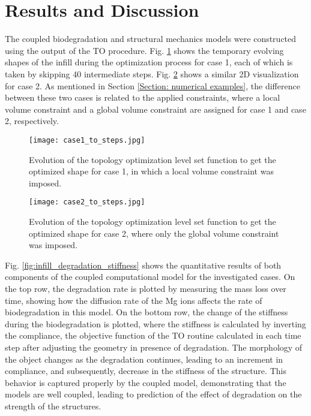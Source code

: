 \section{Results and Discussion}\label{section:infill_results}

The coupled biodegradation and structural mechanics models were constructed using the output of the TO procedure. Fig. \ref{fig:infill_case1_to_steps} shows the temporary evolving shapes of the infill during the optimization process for case 1, each of which is taken by skipping 40 intermediate steps. Fig. \ref{fig:infill_case2_to_steps} shows a similar 2D visualization for case 2. As mentioned in Section \ref{Section: numerical examples}, the difference between these two cases is related to the applied constraints, where a local volume constraint and a global volume constraint are assigned for case 1 and case 2, respectively. 


\begin{figure}[h]
\centering
\medskip
\texttt{[image: case1\_to\_steps.jpg]}
\caption[Evolution of the topology optimization level set function for case 1]{Evolution of the topology optimization level set function to get the optimized shape for case 1, in which a local volume constraint was imposed.} \label{fig:infill_case1_to_steps}
\end{figure}

\begin{figure}[h]
\centering
\medskip
\texttt{[image: case2\_to\_steps.jpg]}
\caption[Evolution of the topology optimization level set function for case 2]{Evolution of the topology optimization level set function to get the optimized shape for case 2, where only the global volume constraint was imposed.} \label{fig:infill_case2_to_steps}
\end{figure}

Fig. \ref{fig:infill_degradation_stiffness} shows the quantitative results of both components of the coupled computational model for the investigated cases. On the top row, the degradation rate is plotted by measuring the mass loss over time, showing how the diffusion rate of the Mg ions affects the rate of biodegradation in this model. On the bottom row, the change of the stiffness during the biodegradation is plotted, where the stiffness is calculated by inverting the compliance, the objective function of the TO routine calculated in each time step after adjusting the geometry in presence of degradation. The morphology of the object changes as the degradation continues, leading to an increment in compliance, and subsequently, decrease in the stiffness of the structure. This behavior is captured properly by the coupled model, demonstrating that the models are well coupled, leading to prediction of the effect of degradation on the strength of the structures. 

